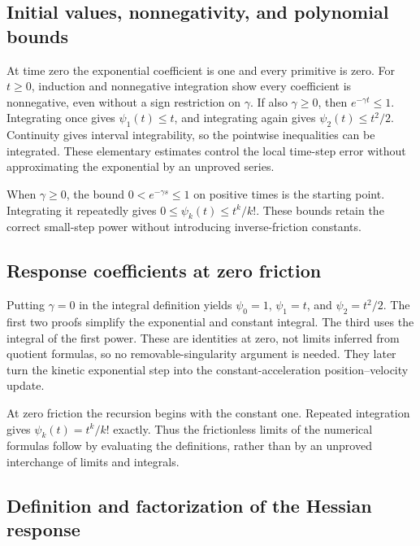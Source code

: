 \documentclass[11pt,a4paper]{report}
\begin{document}
\subsection{\texorpdfstring{Initial values, nonnegativity, and polynomial bounds}{Initial values, nonnegativity, and polynomial bounds}}
\label{report-step-KineticLangevin-Coefficients-lean-4}


At time zero the exponential coefficient is one and every primitive is zero. For \(t\ge0\), induction and nonnegative integration show every coefficient is nonnegative, even without a sign restriction on \(\gamma\). If also \(\gamma\ge0\), then \(e^{-\gamma t}\le1\). Integrating once gives \(\psi_1(t)\le t\), and integrating again gives \(\psi_2(t)\le t^2/2\). Continuity gives interval integrability, so the pointwise inequalities can be integrated. These elementary estimates control the local time-step error without approximating the exponential by an unproved series.



When \(\gamma\ge0\), the bound \(0<e^{-\gamma s}\le1\) on positive times is the starting point. Integrating it repeatedly gives \(0\le\psi_k(t)\le t^k/k!\). These bounds retain the correct small-step power without introducing inverse-friction constants.

\subsection{\texorpdfstring{Response coefficients at zero friction}{Response coefficients at zero friction}}
\label{report-step-KineticLangevin-Coefficients-lean-5}


Putting \(\gamma=0\) in the integral definition yields \(\psi_0=1\), \(\psi_1=t\), and \(\psi_2=t^2/2\). The first two proofs simplify the exponential and constant integral. The third uses the integral of the first power. These are identities at zero, not limits inferred from quotient formulas, so no removable-singularity argument is needed. They later turn the kinetic exponential step into the constant-acceleration position–velocity update.



At zero friction the recursion begins with the constant one. Repeated integration gives \(\psi_k(t)=t^k/k!\) exactly. Thus the frictionless limits of the numerical formulas follow by evaluating the definitions, rather than by an unproved interchange of limits and integrals.

\subsection{\texorpdfstring{Definition and factorization of the Hessian response}{Definition and factorization of the Hessian response}}
\label{report-step-KineticLangevin-Coefficients-lean-6}
\end{document}
